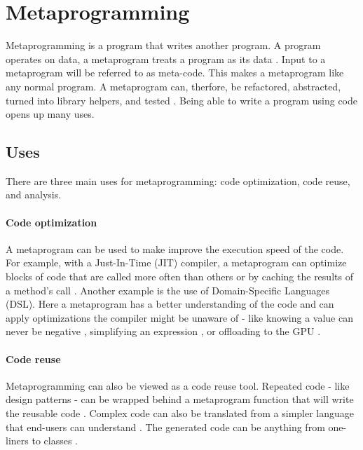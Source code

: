 \section{Metaprogramming}
Metaprogramming is a program that writes another program.
A program operates on data, a metaprogram treats a program as its data \cite{savidis_19_01, anggoro_17_01, sheard_01_01}.
Input to a metaprogram will be referred to as meta-code.
This makes a metaprogram like any normal program.
A metaprogram can, therfore, be refactored, abstracted, turned into library helpers, and tested \cite{lilis_15_01}.
Being able to write a program using code opens up many uses.



\subsection{Uses}
There are three main uses for metaprogramming: code optimization, code reuse, and analysis.

\paragraph{Code optimization}
A metaprogram can be used to make improve the execution speed of the code.
For example, with a Just-In-Time (JIT) compiler, a metaprogram can optimize blocks of code that are called more often than others \cite{hinsen_13_01} or by caching the results of a method's call \cite{seaton_15_01}.
Another example is the use of Domain-Specific Languages (DSL). 
Here a metaprogram has a better understanding of the code and can apply optimizations the compiler might be unaware of - like knowing a value can never be negative \cite{hinsen_13_01}, simplifying an expression \cite{sheard_01_01}, or offloading to the GPU \cite{videau_18_01}.

\paragraph{Code reuse}
Metaprogramming can also be viewed as a code reuse tool.
Repeated code - like design patterns \cite{lilis_15_01, alexandrescu_01_01} - can be wrapped behind a metaprogram function that will write the reusable code \cite{savidis_19_01, klabnik_2019_01}.
Complex code can also be translated from a simpler language that end-users can understand \cite{hinsen_13_01}.
The generated code can be anything from one-liners to classes \cite{savidis_19_01}.

